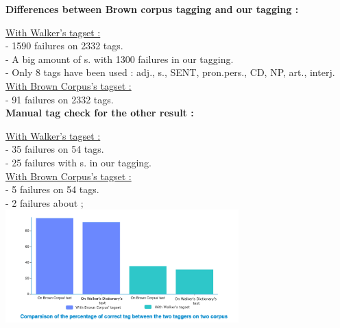 \begin{center}
\large
\textbf{Differences between Brown corpus tagging and our tagging :}\\[4mm]
\normalsize

\underline{With Walker's tagset :}\\[2mm]
	- 1590 failures on 2332 tags.\\
	- A big amount of s. with 1300 failures in our tagging.\\
	- Only 8 tags have been used : adj., s., SENT, pron.pers., CD, NP, art., interj.\\[4mm]
\underline{With Brown Corpus's tagset :}\\[2mm]
	- 91 failures on 2332 tags.\\[4mm]

\large
\textbf{Manual tag check for the other result :}\\[2mm]
\normalsize

\underline{With Walker's tagset :}\\[2mm]
	- 35 failures on 54 tags.\\
	- 25 failures with s. in our tagging.\\[4mm]
\underline{With Brown Corpus's tagset :}\\[2mm]
	- 5 failures on 54 tags.\\
	- 2 failures about ;\\[2mm]
	
		\includegraphics[width=9cm]{chart3.png}

\end{center}

